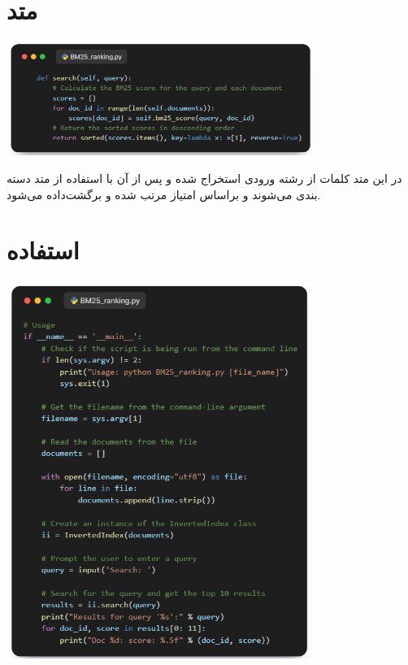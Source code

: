 \documentclass[12pt, dvipsnames, svgnames, x11names,]{article}
\begin{document}
	
	\section{متد }
	
		\begin{center}
			{\includegraphics[width=10cm]{images/07.png}} \par
		\end{center}
		
		{\normalsize 
			در این متد کلمات از رشته ورودی استخراج شده و پس از آن با استفاده از متد  دسته بندی می‌شوند و براساس امتیاز مرتب شده و برگشت‌داده می‌شود.
		}
		
		
	\section{استفاده}
	
		\begin{center}
			{\includegraphics[width=10cm]{images/08.png}} \par
		\end{center}
		
\end{document}

